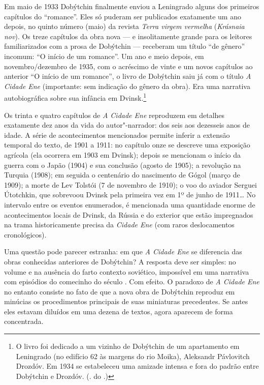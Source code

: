 Em maio de 1933 Dobýtchin finalmente enviou a Leningrado alguns dos
primeiros capítulos do ``romance''. Eles só puderam ser publicados
exatamente um ano depois, no quinto número (maio) da revista \emph{Terra
virgem vermelha} (\emph{Krásnaia nov}). Os treze capítulos da obra nova
--- e insolitamente grande para os leitores familiarizados com a prosa
de Dobýtchin --- receberam um título ``de gênero'' incomum: ``O início
de um romance''. Um ano e meio depois, em novembro/dezembro de 1935, com
o acréscimo de vinte e um novos capítulos ao anterior ``O início de um
romance'', o livro de Dobýtchin saiu já com o título \emph{A Cidade Ene}
(importante: sem indicação do gênero da obra). Era uma narrativa
autobiográfica sobre sua infância em Dvinsk.\footnote{O livro foi
  dedicado a um vizinho de Dobýtchin de um apartamento em Leningrado (no
  edifício 62 às margens do rio Moika), Aleksandr Pávlovitch Drozdóv. Em
  1934 se estabeleceu uma amizade intensa e fora do padrão entre
  Dobýtchin e Drozdóv. (\scalebox{.8}{N}. do \scalebox{.8}{A}.)}

Os trinta e quatro capítulos de \emph{A Cidade Ene} reproduzem em
detalhes exatamente dez anos da vida do autor"-narrador: dos seis aos
dezesseis anos de idade. A série de acontecimentos mencionados permite
inferir a extensão temporal do texto, de 1901 a 1911: no capítulo onze
se descreve uma exposição agrícola (ela ocorrera em 1903 em Dvinsk);
depois se mencionam o início da guerra com o Japão (1904) e sua
conclusão (agosto de 1905); a revolução na Turquia (1908); em seguida o
centenário do nascimento de Gógol (março de 1909); a morte de Lev
Tolstói (7 de novembro de 1910); o voo do aviador Serguei Útotchkin, que
sobrevoou Dvinsk pela primeira vez em 1º de junho de 1911\ldots{} No
intervalo entre os eventos enumerados, é mencionada uma quantidade
enorme de acontecimentos locais de Dvinsk, da Rússia e do exterior que
estão impregnados na trama historicamente precisa da \emph{Cidade Ene}
(com raros deslocamentos cronológicos).

Uma questão pode parecer estranha: em que \emph{A Cidade Ene} se
diferencia das obras conhecidas anteriores de Dobýtchin? A resposta deve
ser simples: no volume e na ausência do farto contexto soviético,
impossível em uma narrativa com episódios do comecinho do século \scalebox{.8}{XX}. Com
efeito. O paradoxo de \emph{A Cidade Ene} no entanto consiste no fato de
que a nova obra de Dobýtchin reproduz em minúcias os procedimentos
principais de suas miniaturas precedentes. Se antes eles estavam
diluídos em uma dezena de textos, agora aparecem de forma concentrada.

